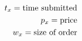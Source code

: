 \documentclass[preview]{standalone}
\begin{document}
\begin{align*}
\special{dvisvgm:raw <g id='unique000'>}t_x = \text{time submitted} \\ p_x = \text{price} \\ w_x = \text{size of order}\special{dvisvgm:raw </g>}
\end{align*}
\end{document}
